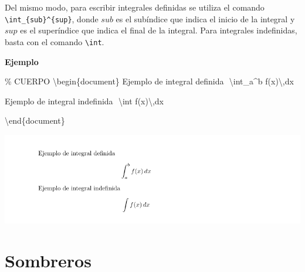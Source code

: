 \documentclass[
  letterpaper,
  DIV=11,
  numbers=noendperiod]{scrreport}
\newenvironment{Shaded}{\begin{snugshade}}{\end{snugshade}}
\newcommand{\CommentTok}[1]{\textcolor[rgb]{0.37,0.37,0.37}{#1}}
\newcommand{\ExtensionTok}[1]{\textcolor[rgb]{0.00,0.23,0.31}{#1}}
\newcommand{\KeywordTok}[1]{\textcolor[rgb]{0.00,0.23,0.31}{#1}}
\newcommand{\NormalTok}[1]{\textcolor[rgb]{0.00,0.23,0.31}{#1}}
\newcommand{\SpecialCharTok}[1]{\textcolor[rgb]{0.37,0.37,0.37}{#1}}
\newcommand{\SpecialStringTok}[1]{\textcolor[rgb]{0.13,0.47,0.30}{#1}}
\begin{document}
Del mismo modo, para escribir integrales definidas se utiliza el comando
\texttt{\textbackslash{}int\_\{sub\}\^{}\{sup\}}, donde \(sub\) es el
subíndice que indica el inicio de la integral y \(sup\) es el
superíndice que indica el final de la integral. Para integrales
indefinidas, basta con el comando \texttt{\textbackslash{}int}.

\textbf{Ejemplo}

\begin{Shaded}
\begin{Highlighting}[]
\CommentTok{\% CUERPO}
\KeywordTok{\textbackslash{}begin}\NormalTok{\{}\ExtensionTok{document}\NormalTok{\}}
\NormalTok{Ejemplo de integral definida}
\SpecialStringTok{$$}
\SpecialCharTok{\textbackslash{}int}\SpecialStringTok{\_a\^{}b f(x)}\SpecialCharTok{\textbackslash{},}\SpecialStringTok{dx}
\SpecialStringTok{$$}




\NormalTok{Ejemplo de integral indefinida}
\SpecialStringTok{$$}
\SpecialCharTok{\textbackslash{}int}\SpecialStringTok{ f(x)}\SpecialCharTok{\textbackslash{},}\SpecialStringTok{dx}
\SpecialStringTok{$$}



\KeywordTok{\textbackslash{}end}\NormalTok{\{}\ExtensionTok{document}\NormalTok{\}}
\end{Highlighting}
\end{Shaded}

\begin{tcolorbox}[enhanced jigsaw, opacitybacktitle=0.6, coltitle=black, colbacktitle=quarto-callout-note-color!10!white, title={Salida}, colback=white, toprule=.15mm, breakable, opacityback=0, left=2mm, rightrule=.15mm, toptitle=1mm, colframe=quarto-callout-note-color-frame, bottomtitle=1mm, titlerule=0mm, arc=.35mm, bottomrule=.15mm, leftrule=.75mm]
\includegraphics{./img/formulas/integral.png}
\end{tcolorbox}

\hypertarget{sombreros}{%
\section{Sombreros}\label{sombreros}}
\end{document}

